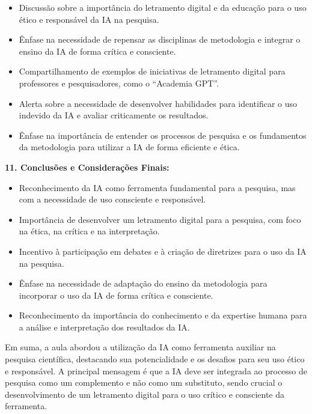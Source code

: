 \documentclass[
  a4paper,
]{book}
\providecommand{\tightlist}{%
  \setlength{\itemsep}{0pt}\setlength{\parskip}{0pt}}\usepackage{longtable,booktabs,array}
\begin{document}
\begin{tcolorbox}
\begin{itemize}
\tightlist
\item
  Discussão sobre a importância do letramento digital e da educação para
  o uso ético e responsável da IA na pesquisa.
\item
  Ênfase na necessidade de repensar as disciplinas de metodologia e
  integrar o ensino da IA de forma crítica e consciente.
\item
  Compartilhamento de exemplos de iniciativas de letramento digital para
  professores e pesquisadores, como o ``Academia GPT''.
\item
  Alerta sobre a necessidade de desenvolver habilidades para identificar
  o uso indevido da IA e avaliar criticamente os resultados.
\item
  Ênfase na importância de entender os processos de pesquisa e os
  fundamentos da metodologia para utilizar a IA de forma eficiente e
  ética.\vspace{0.5em}
\end{itemize}

\textbf{11. Conclusões e Considerações Finais:}\vspace{0.5em}

\begin{itemize}
\tightlist
\item
  Reconhecimento da IA como ferramenta fundamental para a pesquisa, mas
  com a necessidade de uso consciente e responsável.
\item
  Importância de desenvolver um letramento digital para a pesquisa, com
  foco na ética, na crítica e na interpretação.
\item
  Incentivo à participação em debates e à criação de diretrizes para o
  uso da IA na pesquisa.
\item
  Ênfase na necessidade de adaptação do ensino da metodologia para
  incorporar o uso da IA de forma crítica e consciente.
\item
  Reconhecimento da importância do conhecimento e da expertise humana
  para a análise e interpretação dos resultados da IA.\vspace{0.5em}
\end{itemize}

Em suma, a aula abordou a utilização da IA como ferramenta auxiliar na
pesquisa científica, destacando sua potencialidade e os desafios para
seu uso ético e responsável. A principal mensagem é que a IA deve ser
integrada ao processo de pesquisa como um complemento e não como um
substituto, sendo crucial o desenvolvimento de um letramento digital
para o uso crítico e consciente da ferramenta.

\end{tcolorbox}
\end{document}
